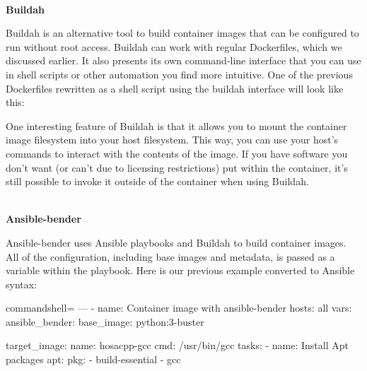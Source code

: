 \hspace*{\fill} \\ %
\noindent
\textbf{Buildah}

Buildah is an alternative tool to build container images that can be configured to run without root access. Buildah can work with regular Dockerfiles, which we discussed earlier. It also presents its own command-line interface that you can use in shell scripts or other automation you find more intuitive. One of the previous Dockerfiles rewritten as a shell script using the buildah interface will look like this:


One interesting feature of Buildah is that it allows you to mount the container image filesystem into your host filesystem. This way, you can use your host's commands to interact with the contents of the image. If you have software you don't want (or can't due to licensing restrictions) put within the container, it's still possible to invoke it outside of the container when using Buildah.

\hspace*{\fill} \\ %
\noindent
\textbf{Ansible-bender}

Ansible-bender uses Ansible playbooks and Buildah to build container images. All of the configuration, including base images and metadata, is passed as a variable within the playbook. Here is our previous example converted to Ansible syntax:

\begin{tcblisting}{commandshell={}}
---
- name: Container image with ansible-bender
  hosts: all
  vars:
    ansible_bender:
      base_image: python:3-buster
    
      target_image:
        name: hosacpp-gcc
        cmd: /usr/bin/gcc
tasks:
- name: Install Apt packages
  apt:
    pkg:
      - build-essential
      - gcc
\end{tcblisting}

